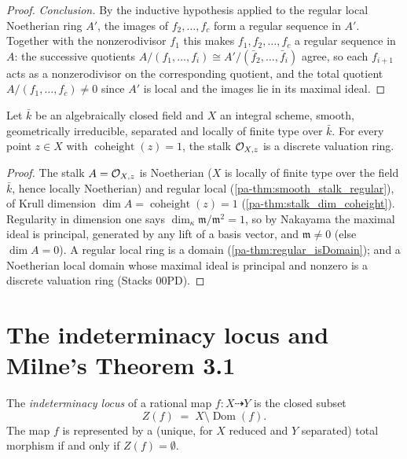 \begin{proof}
  \emph{Conclusion.} By the inductive hypothesis applied to the regular local
  Noetherian ring \(A'\), the images of \(f_2, \dots, f_c\) form a regular
  sequence in \(A'\). Together with the nonzerodivisor \(f_1\) this makes
  \(f_1, f_2, \dots, f_c\) a regular sequence in \(A\): the successive
  quotients \(A/(f_1, \dots, f_i) \cong A'/(\bar f_2, \dots, \bar f_i)\) agree,
  so each \(f_{i+1}\) acts as a nonzerodivisor on the corresponding quotient,
  and the total quotient \(A/(f_1, \dots, f_c) \neq 0\) since \(A'\) is local
  and the images lie in its maximal ideal.
\end{proof}

\begin{theorem}
  \label{pa-thm:smooth_codim_one_dvr}
  \leanok

  Let \(\bar k\) be an algebraically closed field and \(X\) an integral scheme,
  smooth, geometrically irreducible, separated and locally of finite type over
  \(\bar k\). For every point \(z \in X\) with
  \(\operatorname{coheight}(z) = 1\), the stalk \(\mathcal{O}_{X,z}\) is a discrete
  valuation ring.
\end{theorem}
\begin{proof}
  \leanok
  The stalk \(A = \mathcal{O}_{X,z}\) is Noetherian (\(X\) is locally of finite
  type over the field \(\bar k\), hence locally Noetherian) and regular local
  (\ref{pa-thm:smooth_stalk_regular}), of Krull dimension
  \(\dim A = \operatorname{coheight}(z) = 1\)
  (\ref{pa-thm:stalk_dim_coheight}). Regularity in dimension one says
  \(\dim_\kappa \mathfrak m/\mathfrak m^2 = 1\), so by Nakayama the maximal
  ideal is principal, generated by any lift of a basis vector, and
  \(\mathfrak m \neq 0\) (else \(\dim A = 0\)). A regular local ring is a
  domain (\ref{pa-thm:regular_isDomain}); and a Noetherian local domain whose
  maximal ideal is principal and nonzero is a discrete valuation ring
  (Stacks 00PD).
\end{proof}

\section{The indeterminacy locus and Milne's Theorem 3.1}
\label{pa-sec:indeterminacy}

\begin{definition}
  \label{pa-def:indeterminacy_locus}
  \leanok

  The \emph{indeterminacy locus} of a rational map
  \(f : X \dashrightarrow Y\) is the closed subset
  \[
    Z(f) \;=\; X \setminus \operatorname{Dom}(f).
  \]
  The map \(f\) is represented by a (unique, for \(X\) reduced and \(Y\)
  separated) total morphism if and only if \(Z(f) = \emptyset\).
\end{definition}

